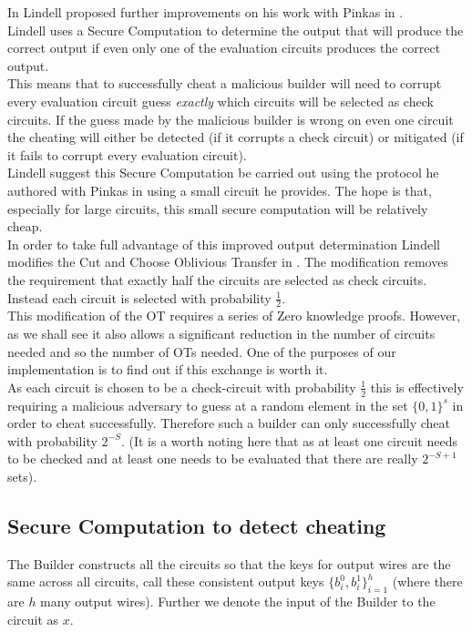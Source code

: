 \documentclass[ %
                    author={Nicholas Tutte},
                supervisor={Prof. Nigel Smart},
                    degree={MEng},
                     title={Secure Two Party Computation},
                  subtitle={A practical comparison of recent protocols},
                      type={Research - GG1K},
                      year={2015} ]{dissertation}
\begin{document}
				In \cite{Lindell_CnC_2013} Lindell proposed further improvements on his work with Pinkas in \cite{LindellAndPinkas2011}.\\

				Lindell uses a Secure Computation to determine the output that will produce the correct output if even only one of the evaluation circuits produces the correct output.\\

				This means that to successfully cheat a malicious builder will need to corrupt every evaluation circuit guess \emph{exactly} which circuits will be selected as check circuits. If the guess made by the malicious builder is wrong on even one circuit the cheating will either be detected (if it corrupts a check circuit) or mitigated (if it fails to corrupt every evaluation circuit).\\

				Lindell suggest this Secure Computation be carried out using the protocol he authored with Pinkas in \cite{LindellAndPinkas2011} using a small circuit he provides. The hope is that, especially for large circuits, this small secure computation will be relatively cheap.\\

				In order to take full advantage of this improved output determination Lindell modifies the Cut and Choose Oblivious Transfer in \cite{LindellAndPinkas2011}. The modification removes the requirement that exactly half the circuits are selected as check circuits. Instead each circuit is selected with probability $\frac{1}{2}$.\\

				This modification of the OT requires a series of Zero knowledge proofs. However, as we shall see it also allows a significant reduction in the number of circuits needed and so the number of OTs needed. One of the purposes of our implementation is to find out if this exchange is worth it.\\

				As each circuit is chosen to be a check-circuit with probability $\frac{1}{2}$ this is effectively requiring a malicious adversary to guess at a random element in the set $\{0, 1\}^s$ in order to cheat successfully. Therefore such a builder can only successfully cheat with probability $2^{-S}$. (It is a worth noting here that as at least one circuit needs to be checked and at least one needs to be evaluated that there are really $2^{-S+1}$ sets).

			\subsection{Secure Computation to detect cheating}
				The Builder constructs all the circuits so that the keys for output wires are the same across all circuits, call these consistent output keys $\{b_i^0, b_i^1\}_{i = 1}^{h}$ (where there are $h$ many output wires). Further we denote the input of the Builder to the circuit as $x$.\\
\end{document}
